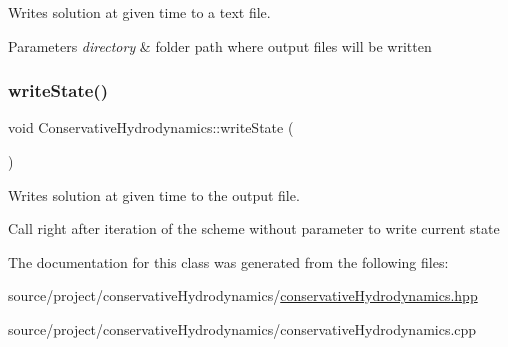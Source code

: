 Writes solution at given time to a text file. 


\begin{DoxyParams}{Parameters}
{\em directory} & folder path where output files will be written \\
\hline
\end{DoxyParams}
\mbox{\label{classConservativeHydrodynamics_abdbc9fef9b64618ae71d011684fcfa82}} 
\subsubsection{\texorpdfstring{write\+State()}{writeState()}\hspace{0.1cm}{\footnotesize\ttfamily [2/2]}}
{\footnotesize\ttfamily void Conservative\+Hydrodynamics\+::write\+State (\begin{DoxyParamCaption}{ }\end{DoxyParamCaption})}



Writes solution at given time to the output file. 

Call right after iteration of the scheme without parameter to write current state 

The documentation for this class was generated from the following files\+:\begin{DoxyCompactItemize}
\item 
source/project/conservative\+Hydrodynamics/\hyperlink{conservativeHydrodynamics_8hpp}{conservative\+Hydrodynamics.\+hpp}\item 
source/project/conservative\+Hydrodynamics/conservative\+Hydrodynamics.\+cpp\end{DoxyCompactItemize}
